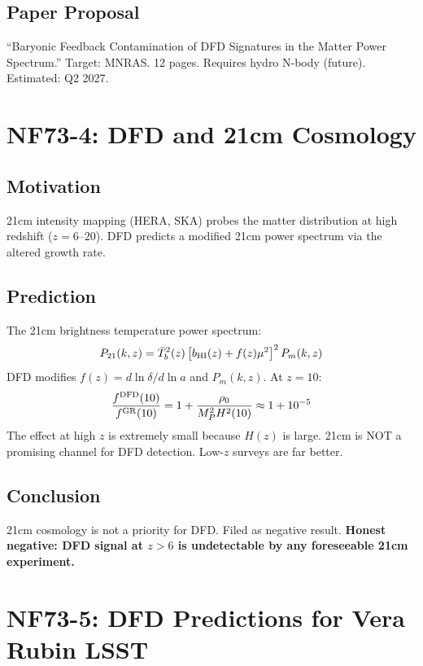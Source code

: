 \documentclass[11pt,a4paper]{article}
\begin{document}
\subsection{Paper Proposal}
``Baryonic Feedback Contamination of DFD Signatures in the Matter Power Spectrum.'' Target: MNRAS. 12 pages. Requires hydro N-body (future). Estimated: Q2 2027.

\section{NF73-4: DFD and 21cm Cosmology}

\subsection{Motivation}
21cm intensity mapping (HERA, SKA) probes the matter distribution at high redshift ($z = 6$--$20$). DFD predicts a modified 21cm power spectrum via the altered growth rate.

\subsection{Prediction}
The 21cm brightness temperature power spectrum:
\[
P_{21}(k, z) = \bar{T}_b^2(z)\left[b_{\rm HI}(z) + f(z)\mu^2\right]^2 P_m(k, z)
\]
DFD modifies $f(z) = d\ln\delta/d\ln a$ and $P_m(k,z)$. At $z = 10$:
\[
\frac{f^{\rm DFD}(10)}{f^{\rm GR}(10)} = 1 + \frac{\rho_0}{M_P^2 H^2(10)} \approx 1 + 10^{-5}
\]
The effect at high $z$ is extremely small because $H(z)$ is large. 21cm is NOT a promising channel for DFD detection. Low-$z$ surveys are far better.

\subsection{Conclusion}
21cm cosmology is not a priority for DFD. Filed as negative result. \textbf{Honest negative: DFD signal at $z > 6$ is undetectable by any foreseeable 21cm experiment.}

\section{NF73-5: DFD Predictions for Vera Rubin LSST}
\end{document}
